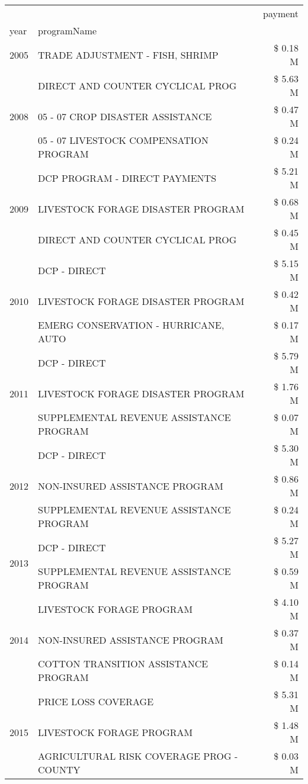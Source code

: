 \begin{tabular}{llr}
\toprule
 &  & payment \\
year & programName &  \\
\midrule
2005 & TRADE ADJUSTMENT - FISH, SHRIMP & \$ 0.18 M \\
\cline{1-3}
\multirow[t]{3}{*}{2008} & DIRECT AND COUNTER CYCLICAL PROG & \$ 5.63 M \\
 & 05 - 07 CROP DISASTER ASSISTANCE & \$ 0.47 M \\
 & 05 - 07 LIVESTOCK COMPENSATION PROGRAM & \$ 0.24 M \\
\cline{1-3}
\multirow[t]{3}{*}{2009} & DCP PROGRAM - DIRECT PAYMENTS & \$ 5.21 M \\
 & LIVESTOCK FORAGE DISASTER  PROGRAM & \$ 0.68 M \\
 & DIRECT AND COUNTER CYCLICAL PROG & \$ 0.45 M \\
\cline{1-3}
\multirow[t]{3}{*}{2010} & DCP - DIRECT & \$ 5.15 M \\
 & LIVESTOCK FORAGE DISASTER PROGRAM & \$ 0.42 M \\
 & EMERG CONSERVATION - HURRICANE, AUTO & \$ 0.17 M \\
\cline{1-3}
\multirow[t]{3}{*}{2011} & DCP - DIRECT & \$ 5.79 M \\
 & LIVESTOCK FORAGE DISASTER PROGRAM & \$ 1.76 M \\
 & SUPPLEMENTAL REVENUE ASSISTANCE PROGRAM & \$ 0.07 M \\
\cline{1-3}
\multirow[t]{3}{*}{2012} & DCP - DIRECT & \$ 5.30 M \\
 & NON-INSURED ASSISTANCE PROGRAM & \$ 0.86 M \\
 & SUPPLEMENTAL REVENUE ASSISTANCE PROGRAM & \$ 0.24 M \\
\cline{1-3}
\multirow[t]{2}{*}{2013} & DCP - DIRECT & \$ 5.27 M \\
 & SUPPLEMENTAL REVENUE ASSISTANCE PROGRAM & \$ 0.59 M \\
\cline{1-3}
\multirow[t]{3}{*}{2014} & LIVESTOCK FORAGE PROGRAM & \$ 4.10 M \\
 & NON-INSURED ASSISTANCE PROGRAM & \$ 0.37 M \\
 & COTTON TRANSITION ASSISTANCE PROGRAM & \$ 0.14 M \\
\cline{1-3}
\multirow[t]{3}{*}{2015} & PRICE LOSS COVERAGE & \$ 5.31 M \\
 & LIVESTOCK FORAGE PROGRAM & \$ 1.48 M \\
 & AGRICULTURAL RISK COVERAGE PROG - COUNTY & \$ 0.03 M \\

\end{tabular}
